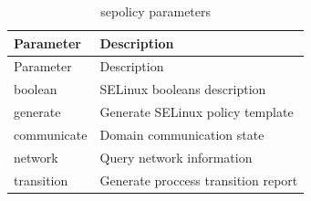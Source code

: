 \documentclass[
  14pt,
  english,
  a4paper,
]{scrreprt}
\begin{document}
\hypertarget{tbl:sepolicy_parm}{}
\begin{longtable}[]{@{}ll@{}}
\caption{\label{tbl:sepolicy_parm}sepolicy parameters}\tabularnewline
\toprule
\begin{minipage}[b]{0.18\columnwidth}\raggedright
Parameter\strut
\end{minipage} & \begin{minipage}[b]{0.50\columnwidth}\raggedright
Description\strut
\end{minipage}\tabularnewline
\midrule
\endfirsthead
\toprule
\begin{minipage}[b]{0.18\columnwidth}\raggedright
Parameter\strut
\end{minipage} & \begin{minipage}[b]{0.50\columnwidth}\raggedright
Description\strut
\end{minipage}\tabularnewline
\midrule
\endhead
\begin{minipage}[t]{0.18\columnwidth}\raggedright
boolean\strut
\end{minipage} & \begin{minipage}[t]{0.50\columnwidth}\raggedright
SELinux booleans description\strut
\end{minipage}\tabularnewline
\begin{minipage}[t]{0.18\columnwidth}\raggedright
generate\strut
\end{minipage} & \begin{minipage}[t]{0.50\columnwidth}\raggedright
Generate SELinux policy template\strut
\end{minipage}\tabularnewline
\begin{minipage}[t]{0.18\columnwidth}\raggedright
communicate\strut
\end{minipage} & \begin{minipage}[t]{0.50\columnwidth}\raggedright
Domain communication state\strut
\end{minipage}\tabularnewline
\begin{minipage}[t]{0.18\columnwidth}\raggedright
network\strut
\end{minipage} & \begin{minipage}[t]{0.50\columnwidth}\raggedright
Query network information\strut
\end{minipage}\tabularnewline
\begin{minipage}[t]{0.18\columnwidth}\raggedright
transition\strut
\end{minipage} & \begin{minipage}[t]{0.50\columnwidth}\raggedright
Generate proccess transition report\strut

\end{minipage}
\end{longtable}
\end{document}
